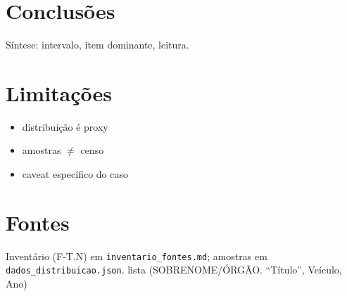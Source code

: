 \documentclass[11pt,a4paper]{article}
\begin{document}
\section{Conclusões}
{{Síntese: intervalo, item dominante, leitura.}}

\section*{Limitações}
\begin{itemize}\setlength\itemsep{0.1em}
  \item {{distribuição é proxy}} \item {{amostras $\neq$ censo}} \item {{caveat específico do caso}}
\end{itemize}

\section*{Fontes}
\small\noindent Inventário (F-T.N) em \texttt{inventario\_fontes.md}; amostras em
\texttt{dados\_distribuicao.json}. {{lista (SOBRENOME/ÓRGÃO. ``Título'', Veículo, Ano)}}
\end{document}
